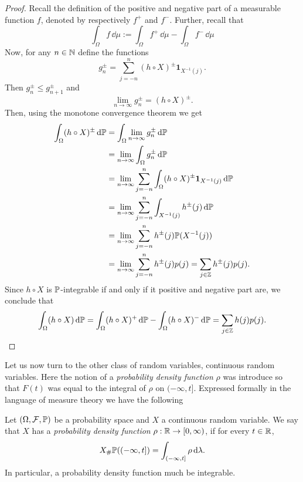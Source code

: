 \begin{proof}
Recall the definition of the positive and negative part of a measurable function $f$, denoted by respectively $f^+$ and $f^-$. Further, recall that 
\[
	\int_\Omega f \, \dd \mu := \int_\Omega f^+ \, \dd \mu - \int_\Omega f^- \, \dd \mu 
\] 
Now, for any $n \in \mathbb N$ define the functions
\[
	g_n^\pm = \sum_{j = -n}^n (h \circ X)^\pm \mathbf{1}_{X^{-1}(j)}.
\]
Then $g_n^\pm \le g_{n+1}^\pm$ and
\[
	\lim_{n \to \infty} g_n^\pm = (h \circ X)^\pm.
\]
Then, using the monotone convergence theorem we get
\begin{align*}
	\int_\Omega (h \circ X)^\pm \, \mathrm{d} \mathbb P &= \int_\Omega \lim_{n \to \infty} g_n^\pm \, \mathrm{d} \mathbb P\\
	&= \lim_{n \to \infty} \int_\Omega g_n^\pm \, \mathrm{d} \mathbb P \\
	&= \lim_{n \to \infty} \sum_{j = -n}^n \int_\Omega (h \circ X)^\pm \mathbf{1}_{X^{-1}(j)} \, \mathrm{d} \mathbb P\\
	&= \lim_{n \to \infty} \sum_{j = -n}^n \int_{X^{-1}(j)} h^\pm(j) \, \mathrm{d} \mathbb P\\
	&= \lim_{n \to \infty} \sum_{j = -n}^n h^\pm(j) \mathbb P(X^{-1}(j)) \\
	&= \lim_{n \to \infty} \sum_{j = -n}^n h^\pm(j) p(j) = \sum_{j \in \mathbb Z} h^\pm(j) p(j).
\end{align*}
Since $h\circ X$ is $\mathbb P$-integrable if and only if it positive and negative part are, we conclude that
\[
	\int_\Omega (h \circ X) \, \mathrm{d} \mathbb P = \int_\Omega (h \circ X)^+ \, \mathrm{d} \mathbb P
	- \int_\Omega (h \circ X)^- \, \mathrm{d} \mathbb P = \sum_{j \in \mathbb Z} h(j) p(j).
\]
\end{proof}

Let us now turn to the other class of random variables, continuous random variables. Here the notion of a \emph{probability density function} $\rho$ was introduce so that $F(t)$ was equal to the integral of $\rho$ on $(-\infty,t]$. Expressed formally in the language of measure theory we have the following

\begin{definition}
Let $(\Omega, \mathcal F, \mathbb{P})$ be a probability space and $X$ a continuous random variable. We say that $X$ has a \emph{probability density function} $\rho : \mathbb R \to [0,\infty)$, if for every $t \in \mathbb R$,
\[
	X_\# \mathbb P((-\infty , t]) = \int_{(-\infty,t]} \rho \, \mathrm{d} \lambda.
\]
In particular, a probability density function much be integrable.
\end{definition}

